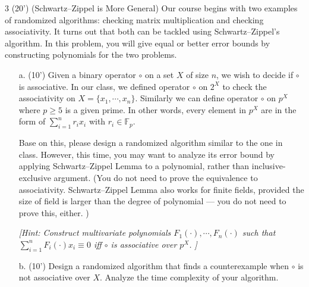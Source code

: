 \begin{question}{3 (20') (Schwartz--Zippel is More General)} 
    Our course begins with two examples of randomized algorithms: checking matrix multiplication and checking associativity. It turns out that both can be tackled using Schwartz--Zippel's algorithm. In this problem, you will give equal or better error bounds by constructing polynomials for the two problems.
 
	\begin{itemize}
		\item[a. (10')] Given a binary operator $\circ$ on a set $X$ of size $n$, we wish to decide if $\circ$ is associative. In our class, we defined operator $\circ$ on $2^{X}$ to check the associativity on $X=\{x_1,\cdots,x_n\}$. Similarly we can define operator $\circ$ on $p^X$ where $p\geq 5$ is a given prime. In other words, every element in $p^X$ are in the form of $\sum_{i=1}^{n}r_ix_i$ with $r_i\in\mathbb{F}_p$. 
		
		Base on this, please design a randomized algorithm similar to the one in class. However, this time, you may want to analyze its error bound by applying Schwartz--Zippel Lemma to a polynomial, rather than inclusive-exclusive argument. (You do not need to prove the equivalence to associativity. Schwartz--Zippel Lemma also works for finite fields, provided the size of field is larger than the degree of polynomial --- you do not need to prove this, either. )
		
		\textit{[Hint: Construct multivariate polynomials $F_1(\cdot),\cdots,F_n(\cdot)$ such that $\sum_{i=1}^{n}F_i(\cdot)x_i\equiv 0$ iff $\circ$ is associative over $p^X$. ]}
		
		\item [b. (10')] Design a randomized algorithm that finds a counterexample when $\circ$ is not associative over $X$. Analyze the time complexity of your algorithm.
	\end{itemize}
\end{question} 

